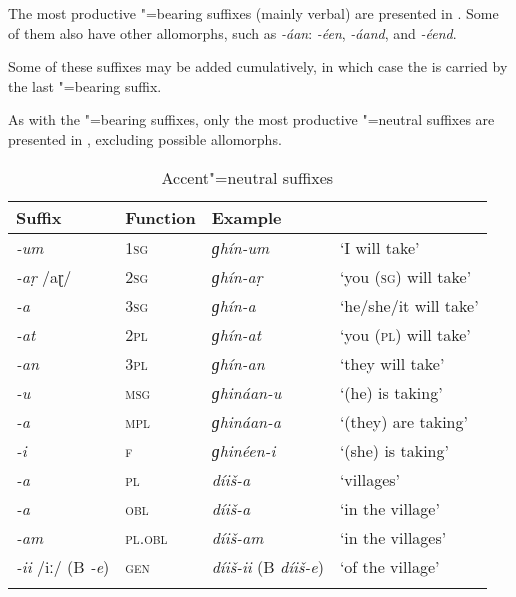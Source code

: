 The most productive "=bearing suffixes (mainly verbal) are presented in . Some of them also have other allomorphs, such as \textit{-áan}: \textit{-éen}, \textit{-áand}, and \textit{-éend}.


Some of these suffixes may be added cumulatively, in which case the  is carried by the last "=bearing suffix.


As with the "=bearing suffixes, only the most productive "=neutral suffixes are presented in , excluding possible allomorphs.



\begin{table} 
\caption{Accent"=neutral suffixes}
\begin{tabularx}{\textwidth}{ l@{\hspace{20pt}} l@{\hspace{20pt}} l@{\hspace{20pt}} Q }
\lsptoprule
Suffix &
Function &
Example &
\\\midrule
\textit{-um} &
\textsc{1sg} &
\textit{ɡhín-um} &
`I will take'\\
\textit{-aṛ} /aɽ/ &
\textsc{2sg} &
\textit{ɡhín-aṛ} &
`you (\textsc{sg}) will take'\\
\textit{-a} &
\textsc{3sg} &
\textit{ɡhín-a} &
`he/she/it will take'\\
\textit{-at} &
\textsc{2pl} &
\textit{ɡhín-at} &
`you (\textsc{pl}) will take'\\
\textit{-an} &
\textsc{3pl} &
\textit{ɡhín-an} &
`they will take'\\
\textit{-u} &
\textsc{msg} &
\textit{ɡhináan-u} &
`(he) is taking'\\
\textit{-a} &
\textsc{mpl} &
\textit{ɡhináan-a} &
`(they) are taking'\\
\textit{-i} &
\textsc{f} &
\textit{ɡhinéen-i} &
`(she) is taking'\\
\textit{-a} &
\textsc{pl} &
\textit{díiš-a} &
`villages'\\
\textit{-a} &
\textsc{obl} &
\textit{díiš-a} &
`in the village'\\
\textit{-am} &
\textsc{pl.obl} &
\textit{díiš-am} &
`in the villages'\\
\textit{-ii} /iː/ (B \textit{-e}) &
\textsc{gen} &
\textit{díiš-ii} (B \textit{díiš-e}) &
`of the village'\\\lspbottomrule
\end{tabularx}
\label{tab:3-6}
\end{table}


